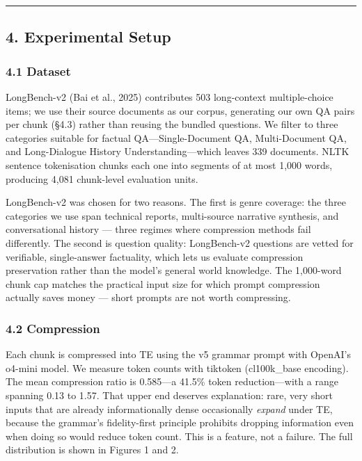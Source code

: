 \documentclass[
]{article}
\begin{document}
\begin{center}\rule{0.5\linewidth}{0.5pt}\end{center}

\subsection{4. Experimental Setup}\label{experimental-setup}

\subsubsection{4.1 Dataset}\label{dataset}

LongBench-v2 (Bai et al., 2025) contributes 503 long-context
multiple-choice items; we use their source documents as our corpus,
generating our own QA pairs per chunk (§4.3) rather than reusing the
bundled questions. We filter to three categories suitable for factual
QA---Single-Document QA, Multi-Document QA, and Long-Dialogue History
Understanding---which leaves 339 documents. NLTK sentence tokenisation
chunks each one into segments of at most 1,000 words, producing 4,081
chunk-level evaluation units.

LongBench-v2 was chosen for two reasons. The first is genre coverage:
the three categories we use span technical reports, multi-source
narrative synthesis, and conversational history --- three regimes where
compression methods fail differently. The second is question quality:
LongBench-v2 questions are vetted for verifiable, single-answer
factuality, which lets us evaluate compression preservation rather than
the model's general world knowledge. The 1,000-word chunk cap matches
the practical input size for which prompt compression actually saves
money --- short prompts are not worth compressing.

\subsubsection{4.2 Compression}\label{compression}

Each chunk is compressed into TE using the v5 grammar prompt with
OpenAI's o4-mini model. We measure token counts with tiktoken
(cl100k\_base encoding). The mean compression ratio is 0.585---a 41.5\%
token reduction---with a range spanning 0.13 to 1.57. That upper end
deserves explanation: rare, very short inputs that are already
informationally dense occasionally \emph{expand} under TE, because the
grammar's fidelity-first principle prohibits dropping information even
when doing so would reduce token count. This is a feature, not a
failure. The full distribution is shown in Figures 1 and 2.
\end{document}
